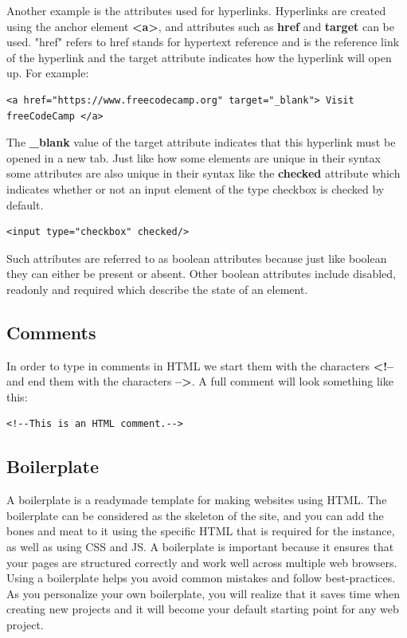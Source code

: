 \documentclass[11pt]{article}
\begin{document}
Another example is the attributes used for hyperlinks. Hyperlinks are created using the anchor
element \textbf{<a>}, and attributes such as \textbf{href} and \textbf{target} can be used. "href" refers to href stands for
hypertext reference and is the reference link of the hyperlink and the target attribute indicates
how the hyperlink will open up. For example:
\begin{verbatim}
<a href="https://www.freecodecamp.org" target="_blank"> Visit freeCodeCamp </a>
\end{verbatim}
The \textbf{\_blank} value of the target attribute indicates that this hyperlink must be opened in a new tab.
Just like how some elements are unique in their syntax some attributes are also unique in their
syntax like the \textbf{checked} attribute which indicates whether or not an input element of the type
checkbox is checked by default.
\begin{verbatim}
<input type="checkbox" checked/>
\end{verbatim}
Such attributes are referred to as boolean attributes because just like boolean they can either be
present or absent. Other boolean attributes include disabled, readonly and required which describe
the state of an element.
\subsection{Comments}
\label{sec:orgb9e10df}
In order to type in comments in HTML we start them with the characters \textbf{<!--} and end them with the
characters \textbf{-->}. A full comment will look something like this:
\begin{verbatim}
<!--This is an HTML comment.-->
\end{verbatim}
\subsection{Boilerplate}
\label{sec:orgb6d19b0}
A boilerplate is a readymade template for making websites using HTML. The boilerplate can be
considered as the skeleton of the site, and you can add the bones and meat to it using the specific
HTML that is required for the instance, as well as using CSS and JS.
A boilerplate is important because it ensures that your pages are structured correctly and work well
across multiple web browsers. Using a boilerplate helps you avoid common mistakes and follow
best-practices.
As you personalize your own boilerplate, you will realize that it saves time when creating new
projects and it will become your default starting point for any web project.
\end{document}
